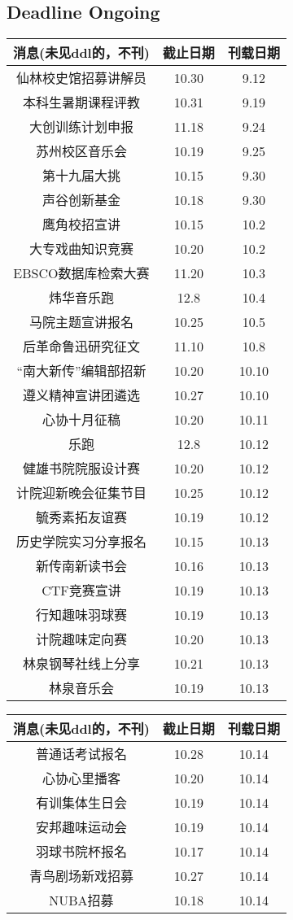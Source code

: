 \documentclass[letterpaper, 12pt]{article}
\begin{document}
\begin{multicols}{2}

\section{Deadline Ongoing}
\begin{tabular}{|c|c|c|}
    \hline
    消息(未见ddl的，不刊) & 截止日期 & 刊载日期\\
    \hline\hline
    仙林校史馆招募讲解员 & 10.30 & 9.12\\
    本科生暑期课程评教 & 10.31 & 9.19\\
    大创训练计划申报 & 11.18 & 9.24\\
    苏州校区音乐会 & 10.19 & 9.25\\
    第十九届大挑 & 10.15 & 9.30\\
    声谷创新基金 & 10.18 & 9.30\\
    鹰角校招宣讲 & 10.15 & 10.2\\
    大专戏曲知识竞赛 & 10.20 & 10.2\\
    EBSCO数据库检索大赛 & 11.20 & 10.3\\
    炜华音乐跑 & 12.8 & 10.4\\
    马院主题宣讲报名 & 10.25 & 10.5\\
    后革命鲁迅研究征文 & 11.10 & 10.8\\
    “南大新传”编辑部招新 & 10.20 & 10.10\\
    遵义精神宣讲团遴选 & 10.27 & 10.10\\
    心协十月征稿 & 10.20 & 10.11\\
    乐跑 & 12.8 & 10.12\\
    健雄书院院服设计赛 & 10.20 & 10.12\\
    计院迎新晚会征集节目 & 10.25 & 10.12\\
    毓秀素拓友谊赛 & 10.19 & 10.12\\
    历史学院实习分享报名 & 10.15 & 10.13\\
    新传南新读书会 & 10.16 & 10.13\\
    CTF竞赛宣讲 & 10.19 & 10.13\\
    行知趣味羽球赛 & 10.19 & 10.13\\
    计院趣味定向赛 & 10.20 & 10.13\\
    林泉钢琴社线上分享 & 10.21 & 10.13\\
    林泉音乐会 & 10.19 & 10.13\\
    
    \hline
\end{tabular}
\begin{tabular}{|c|c|c|}
    \hline
    消息(未见ddl的，不刊) & 截止日期 & 刊载日期\\
    \hline\hline
    普通话考试报名 & 10.28 & 10.14\\
    心协心里播客 & 10.20 & 10.14\\
    有训集体生日会 & 10.19 & 10.14\\
    安邦趣味运动会 & 10.19 & 10.14\\
    羽球书院杯报名 & 10.17 & 10.14\\
    青鸟剧场新戏招募 & 10.27 & 10.14\\
    NUBA招募 & 10.18 & 10.14\\
    

\end{tabular}
\end{multicols}
\end{document}
